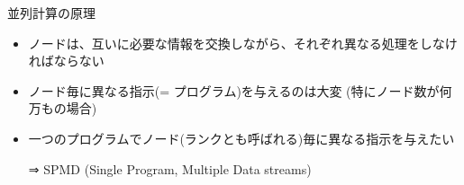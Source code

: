 \documentclass[dvipdfmx]{beamer}
\begin{document}
\begin{frame}[t,fragile]{並列計算の原理}
  \begin{itemize}
  \item ノードは、互いに必要な情報を交換しながら、それぞれ異なる処理をしなければならない
  \item ノード毎に異なる指示(= プログラム)を与えるのは大変 (特にノード数が何万もの場合)
  \item 一つのプログラムでノード(ランクとも呼ばれる)毎に異なる指示を与えたい

    ⇒ SPMD (Single Program, Multiple Data streams)

  \end{itemize}
\end{frame}
\end{document}
